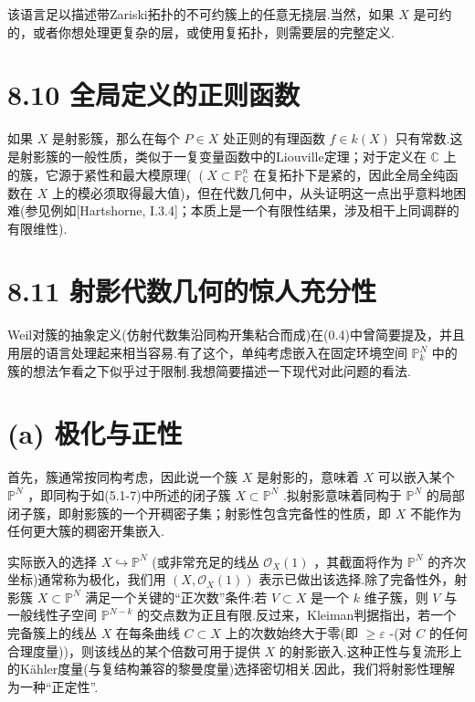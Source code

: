 该语言足以描述带Zariski拓扑的不可约簇上的任意无挠层.当然，如果 \(X\) 是可约的，或者你想处理更复杂的层，或使用复拓扑，则需要层的完整定义.

\section{8.10 全局定义的正则函数}

如果 \(X\) 是射影簇，那么在每个 \(P \in  X\) 处正则的有理函数 \(f \in  k\left( X\right)\) 只有常数.这是射影簇的一般性质，类似于一复变量函数中的Liouville定理；对于定义在 \(\mathbb{C}\) 上的簇，它源于紧性和最大模原理( \(\left( {X \subset  {\mathbb{P}}_{\mathbb{C}}^{n}}\right.\) 在复拓扑下是紧的，因此全局全纯函数在 \(X\) 上的模必须取得最大值)，但在代数几何中，从头证明这一点出乎意料地困难(参见例如[Hartshorne, I.3.4]；本质上是一个有限性结果，涉及相干上同调群的有限维性).

\section{8.11 射影代数几何的惊人充分性}

Weil对簇的抽象定义(仿射代数集沿同构开集粘合而成)在(0.4)中曾简要提及，并且用层的语言处理起来相当容易.有了这个，单纯考虑嵌入在固定环境空间 \({\mathbb{P}}_{k}^{N}\) 中的簇的想法乍看之下似乎过于限制.我想简要描述一下现代对此问题的看法.

\section{(a) 极化与正性}

首先，簇通常按同构考虑，因此说一个簇 \(X\) 是射影的，意味着 \(X\) 可以嵌入某个 \({\mathbb{P}}^{N}\) ，即同构于如(5.1-7)中所述的闭子簇 \(X \subset  {\mathbb{P}}^{N}\) .拟射影意味着同构于 \({\mathbb{P}}^{N}\) 的局部闭子簇，即射影簇的一个开稠密子集；射影性包含完备性的性质，即 \(X\) 不能作为任何更大簇的稠密开集嵌入.

实际嵌入的选择 \(X \hookrightarrow  {\mathbb{P}}^{N}\) (或非常充足的线丛 \({\mathcal{O}}_{X}\left( 1\right)\) ，其截面将作为 \({\mathbb{P}}^{N}\) 的齐次坐标)通常称为极化，我们用 \(\left( {X,{\mathcal{O}}_{X}\left( 1\right) }\right)\) 表示已做出该选择.除了完备性外，射影簇 \(X \subset  {\mathbb{P}}^{N}\) 满足一个关键的“正次数”条件:若 \(V \subset  X\) 是一个 \(k\) 维子簇，则 \(V\) 与一般线性子空间 \({\mathbb{P}}^{N - k}\) 的交点数为正且有限.反过来，Kleiman判据指出，若一个完备簇上的线丛 \(X\) 在每条曲线 \(C \subset  X\) 上的次数始终大于零(即 \(\geq  \varepsilon\) -(对 \(C\) 的任何合理度量))，则该线丛的某个倍数可用于提供 \(X\) 的射影嵌入.这种正性与复流形上的Kähler度量(与复结构兼容的黎曼度量)选择密切相关.因此，我们将射影性理解为一种“正定性”.

